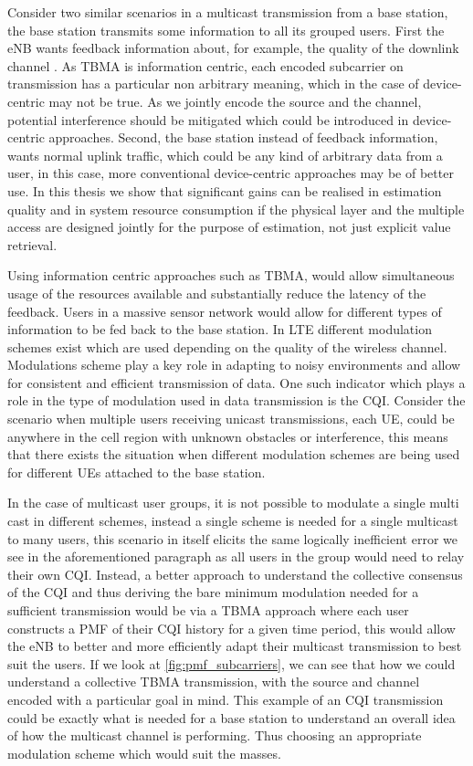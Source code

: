 \documentclass{article}
\begin{document}
Consider two similar scenarios in a multicast transmission from a base station, the base station transmits some information to all its grouped users. First the eNB wants feedback information about, for example, the quality of the downlink channel . As TBMA is information centric, each encoded subcarrier on transmission has a particular non arbitrary meaning, which in the case of device-centric may not be true. As we jointly encode the source and the channel, potential interference should be mitigated which could be introduced in device-centric approaches. Second, the base station instead of feedback information, wants normal uplink traffic, which could be any kind of arbitrary data from a user, in this case, more conventional device-centric approaches may be of better use. In this thesis we show that significant gains can be realised in estimation quality and in system resource consumption if the physical layer and the multiple access are designed jointly for the purpose of estimation, not just explicit value retrieval.

Using information centric approaches such as TBMA, would allow simultaneous usage of the resources available and substantially reduce the latency of the feedback. Users in a massive sensor network would allow for different types of information to be fed back to the base station. In LTE different modulation schemes exist which are used depending on the quality of the wireless channel. Modulations scheme play a key role in adapting to noisy environments and allow for consistent and efficient transmission of data. One such indicator which plays a role in the type of modulation used in data transmission is the \ac{CQI}. Consider the scenario when multiple users receiving unicast transmissions, each UE, could be anywhere in the cell region with unknown obstacles or interference, this means that there exists the situation when different modulation schemes are being used for different UEs attached to the base station. 

In the case of multicast user groups, it is not possible to modulate a single multi cast in different schemes, instead a single scheme is needed for a single multicast to many users, this scenario in itself elicits the same logically inefficient error we see in the aforementioned paragraph as all users in the group would need to relay their own \ac{CQI}. Instead, a better approach to understand the collective consensus of the \ac{CQI} and thus deriving the bare minimum modulation needed for a sufficient transmission would be via a TBMA approach where each user constructs a PMF of their \ac{CQI} history for a given time period, this would allow the eNB to better and more efficiently adapt their multicast transmission to best suit the users. If we look at \cref{fig:pmf_subcarriers}, we can see that how we could understand a collective TBMA transmission, with the source and channel encoded with a particular goal in mind. This example of an CQI transmission could be exactly what is needed for a base station to understand an overall idea of how the multicast channel is performing. Thus choosing an appropriate modulation scheme which would suit the masses. 
\end{document}
